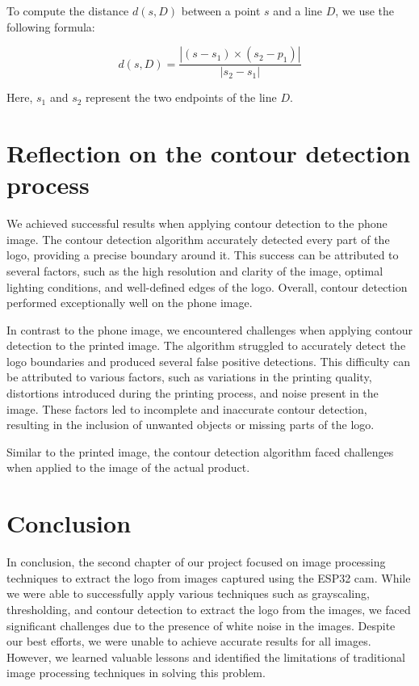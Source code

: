 To compute the distance $d(s, D)$ between a point $s$ and a line $D$, we use the following formula:

\begin{equation*}
    d(s, D) = \frac{|(s - s_1) \times (s_2 - p_1)|}{|s_2 - s_1|}
\end{equation*}

Here, $s_1$ and $s_2$ represent the two endpoints of the line $D$.
\vspace{1em}

\section{Reflection on the contour detection process}
We achieved successful results when applying contour detection to the phone image. The contour detection algorithm accurately detected every part of the logo, providing a precise boundary around it. This success can be attributed to several factors, such as the high resolution and clarity of the image, optimal lighting conditions, and well-defined edges of the logo. Overall, contour detection performed exceptionally well on the phone image.

In contrast to the phone image, we encountered challenges when applying contour detection to the printed image. The algorithm struggled to accurately detect the logo boundaries and produced several false positive detections. This difficulty can be attributed to various factors, such as variations in the printing quality, distortions introduced during the printing process, and noise present in the image. These factors led to incomplete and inaccurate contour detection, resulting in the inclusion of unwanted objects or missing parts of the logo.


Similar to the printed image, the contour detection algorithm faced challenges when applied to the image of the actual product.
\section{Conclusion}
In conclusion, the second chapter of our project focused on image processing techniques to extract the logo from images captured using the ESP32 cam. While we were able to successfully apply various techniques such as grayscaling, thresholding, and contour detection to extract the logo from the images, we faced significant challenges due to the presence of white noise in the images. Despite our best efforts, we were unable to achieve accurate results for all images. However, we learned valuable lessons and identified the limitations of traditional image processing techniques in solving this problem.

